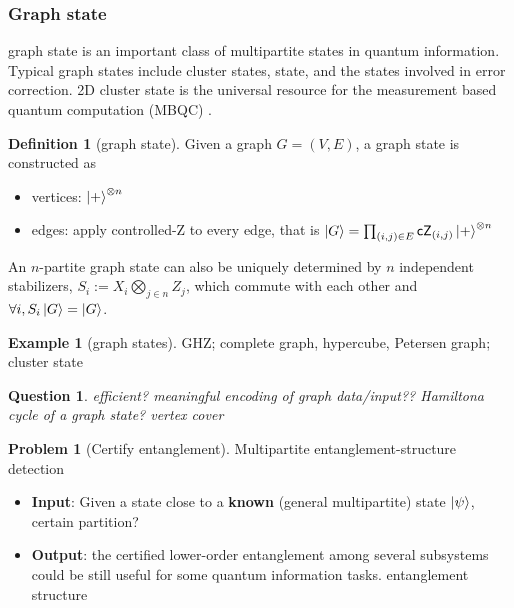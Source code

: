 \documentclass[
10pt,
aps,
pra,
linenumbers,
floatfix,
]{revtex4-2}
\theoremstyle{plain}
\newtheorem{question}{Question}
\theoremstyle{definition}
\newtheorem{definition}{Definition}
\newtheorem{example}{Example}
\newtheorem{problem}{Problem}
\begin{document}
\subsubsection{Graph state}
graph state is an important class of multipartite states in quantum information.
Typical graph states include cluster states,  state, and the states involved in error correction.
2D cluster state is the universal resource for the measurement based quantum computation (MBQC) \cite{briegelMeasurementbasedQuantumComputation2009}.
\begin{definition}[graph state]\label{def:graph_state}
	Given a graph $G=(V,E)$, a graph state is constructed as 
	\begin{itemize}
		\item vertices: $\ket{+}^{\otimes n}$
		\item edges: apply controlled-Z to every edge,
		that is $\ket{G}=\prod_{(i,j)\in E}\textsf{cZ}_{(i,j)} \ket{+}^{\otimes n}$
	\end{itemize}
	An $n$-partite graph state can also be uniquely determined by $n$ independent stabilizers, 
	$S_i:= X_i \bigotimes_{j\in n}Z_j$, 
	which commute with each other and $\forall i,S_i\ket{G}=\ket{G}$.
\end{definition}
\begin{example}[graph states]
	GHZ; complete graph, hypercube, Petersen graph; cluster state
\end{example}
\begin{question}
	efficient? meaningful encoding of graph data/input??
	Hamiltona cycle of a graph state? vertex cover
\end{question}
\begin{problem}[Certify entanglement]
	Multipartite entanglement-structure detection
	\begin{itemize}
		\item \textbf{Input}: Given a state close to a \textbf{known} (general multipartite) state $\ket{\psi}$,
		certain partition?
		\item \textbf{Output}: the certified lower-order entanglement among several subsystems could be still useful for some quantum information tasks.
		entanglement structure
	\end{itemize}
\end{problem}
\end{document}
